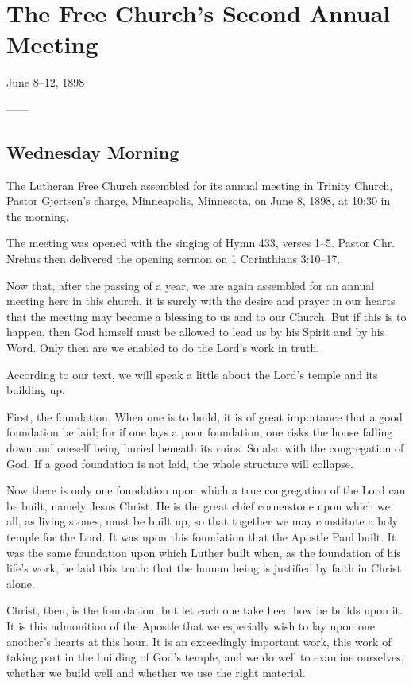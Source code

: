 
\section{The Free Church’s Second Annual Meeting}
June 8–12, 1898

——

\subsection{Wednesday Morning}

The Lutheran Free Church assembled for its annual meeting in Trinity Church, Pastor Gjertsen’s charge, Minneapolis, Minnesota, on June 8, 1898, at 10:30 in the morning.

The meeting was opened with the singing of Hymn 433, verses 1–5. Pastor Chr. Nrehus then delivered the opening sermon on 1 Corinthians 3:10–17.

Now that, after the passing of a year, we are again assembled for an annual meeting here in this church, it is surely with the desire and prayer in our hearts that the meeting may become a blessing to us and to our Church. But if this is to happen, then God himself must be allowed to lead us by his Spirit and by his Word. Only then are we enabled to do the Lord’s work in truth.

According to our text, we will speak a little about the Lord’s temple and its building up.

First, the foundation. When one is to build, it is of great importance that a good foundation be laid; for if one lays a poor foundation, one risks the house falling down and oneself being buried beneath its ruins. So also with the congregation of God. If a good foundation is not laid, the whole structure will collapse.

Now there is only one foundation upon which a true congregation of the Lord can be built, namely Jesus Christ. He is the great chief cornerstone upon which we all, as living stones, must be built up, so that together we may constitute a holy temple for the Lord. It was upon this foundation that the Apostle Paul built. It was the same foundation upon which Luther built when, as the foundation of his life’s work, he laid this truth: that the human being is justified by faith in Christ alone.

Christ, then, is the foundation; but let each one take heed how he builds upon it. It is this admonition of the Apostle that we especially wish to lay upon one another’s hearts at this hour. It is an exceedingly important work, this work of taking part in the building of God’s temple, and we do well to examine ourselves, whether we build well and whether we use the right material.

